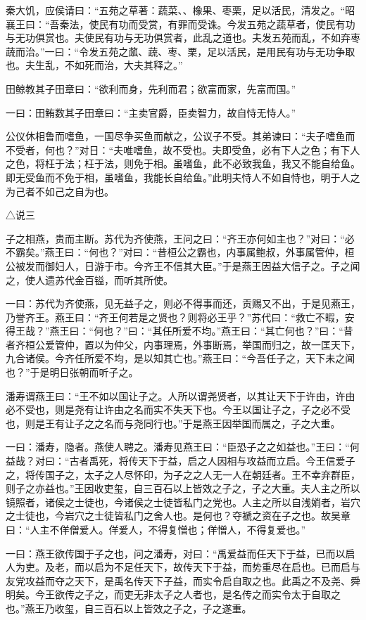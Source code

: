 \documentclass[]{article}
\begin{document}
秦大饥，应侯请曰：``五苑之草著：蔬菜、、橡果、枣栗，足以活民，清发之。``昭襄王曰：``吾秦法，使民有功而受赏，有罪而受诛。今发五苑之蔬草者，使民有功与无功俱赏也。夫使民有功与无功俱赏者，此乱之道也。夫发五苑而乱，不如弃枣蔬而治。''一曰：``令发五苑之蓏、蔬、枣、栗，足以活民，是用民有功与无功争取也。夫生乱，不如死而治，大夫其释之。''

田鲸教其子田章曰：``欲利而身，先利而君；欲富而家，先富而国。''

一曰：田鲔数其子田章曰：``主卖官爵，臣卖智力，故自恃无恃人。''

公仪休相鲁而嗜鱼，一国尽争买鱼而献之，公议子不受。其弟谏曰：``夫子嗜鱼而不受者，何也？''对日：``夫唯嗜鱼，故不受也。夫即受鱼，必有下人之色；有下人之色，将枉于法；枉于法，则免于相。虽嗜鱼，此不必致我鱼，我又不能自给鱼。即无受鱼而不免于相，虽嗜鱼，我能长自给鱼。''此明夫恃人不如自恃也，明于人之为己者不如己之自为也。

△说三

子之相燕，贵而主断。苏代为齐使燕，王问之曰：``齐王亦何如主也？''对曰：``必不霸矣。''燕王曰：``何也？''对曰：``昔桓公之霸也，内事属鲍叔，外事属管仲，桓公被发而御妇人，日游于市。今齐王不信其大臣。''于是燕王因益大信子之。子之闻之，使人遗苏代金百镒，而听其所使。

一曰：苏代为齐使燕，见无益子之，则必不得事而还，贡赐又不出，于是见燕王，乃誉齐王。燕王曰：``齐王何若是之贤也？则将必王乎？''苏代曰：``救亡不暇，安得王哉？''燕王曰：``何也？''曰：``其任所爱不均。''燕王曰：``其亡何也？''曰：``昔者齐桓公爱管仲，置以为仲父，内事理焉，外事断焉，举国而归之，故一匡天下，九合诸侯。今齐任所爱不均，是以知其亡也。''燕王曰：``今吾任子之，天下未之闻也？''于是明日张朝而听子之。

潘寿谓燕王曰：``王不如以国让子之。人所以谓尧贤者，以其让天下于许由，许由必不受也，则是尧有让许由之名而实不失天下也。今王以国让子之，子之必不受也，则是王有让子之之名而与尧同行也。''于是燕王因举国而属之，子之大重。

一曰：潘寿，隐者。燕使人聘之。潘寿见燕王曰：``臣恐子之之如益也。''王曰：``何益哉？对曰：``古者禹死，将传天下于益，启之人因相与攻益而立启。今王信爱子之，将传国子之，太子之人尽怀印，为子之之人无一人在朝廷者。王不幸弃群臣，则子之亦益也。''王因收吏玺，自三百石以上皆效之子之，子之大重。夫人主之所以镜照者，诸侯之士徒也，今诸侯之士徒皆私门之党也。人主之所以自浅娋者，岩穴之士徒也，今岩穴之士徒皆私门之舍人也。是何也？夺褫之资在子之也。故吴章曰：``人主不佯僧爱人。佯爱人，不得复憎也；佯憎人，不得复爱也。''

一曰：燕王欲传国于子之也，问之潘寿，对曰：``禹爱益而任天下于益，已而以启人为吏。及老，而以启为不足任天下，故传天下于益，而势重尽在启也。已而启与友党攻益而夺之天下，是禹名传天下子益，而实令启自取之也。此禹之不及尧、舜明矣。今王欲传之子之，而吏无非太子之人者也，是名传之而实令太于自取之也。''燕王乃收玺，自三百石以上皆效之子之，子之遂重。
\end{document}
